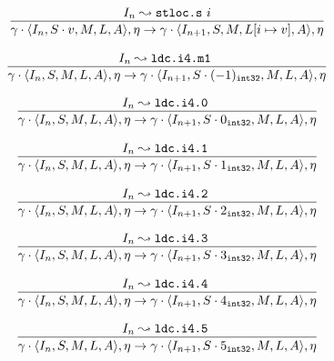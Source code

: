 \documentclass[declaration,shortabstract,english,mgr]{iithesis}
\newcommand{\mstate}[5] {
	\langle#1, #2, #3, #4, #5\rangle
}
\newcommand{\ipointsto}[3] {
	#1 \leadsto \texttt{#2} \text{ } #3
}
\newcommand{\sval}[2] {
	#1_\texttt{#2}
}
\newcommand{\setarrayitem}[3] {
	#1[#2 \mapsto #3]
}
\begin{document}
\begin{equation}
\label{eq:semantics_stlocs}
	\infer{
		\gamma \cdot \mstate{I_n}{S \cdot v}{M}{L}{A}, \eta
			\rightarrow
		\gamma \cdot \mstate{I_{n+1}}{S}{M}{\setarrayitem{L}{i}{v}}{A}, \eta
	}
	{\ipointsto{I_n}{stloc.s}{i}}
\end{equation}

\begin{equation}
\label{eq:semantics_ldci4m1}
	\infer{
		\gamma \cdot \mstate{I_n}{S}{M}{L}{A}, \eta
			\rightarrow
		\gamma \cdot \mstate{I_{n+1}}{S \cdot \sval{(-1)}{int32}}{M}{L}{A}, \eta
	}
	{\ipointsto{I_n}{ldc.i4.m1}}
\end{equation}

\begin{equation}
\label{eq:semantics_ldci40}
	\infer{
		\gamma \cdot \mstate{I_n}{S}{M}{L}{A}, \eta
			\rightarrow
		\gamma \cdot \mstate{I_{n+1}}{S \cdot \sval{0}{int32}}{M}{L}{A}, \eta
	}
	{\ipointsto{I_n}{ldc.i4.0}}
\end{equation}

\begin{equation}
\label{eq:semantics_ldci41}
	\infer{
		\gamma \cdot \mstate{I_n}{S}{M}{L}{A}, \eta
			\rightarrow
		\gamma \cdot \mstate{I_{n+1}}{S \cdot \sval{1}{int32}}{M}{L}{A}, \eta
	}
	{\ipointsto{I_n}{ldc.i4.1}}
\end{equation}

\begin{equation}
\label{eq:semantics_ldci42}
	\infer{
		\gamma \cdot \mstate{I_n}{S}{M}{L}{A}, \eta
			\rightarrow
		\gamma \cdot \mstate{I_{n+1}}{S \cdot \sval{2}{int32}}{M}{L}{A}, \eta
	}
	{\ipointsto{I_n}{ldc.i4.2}}
\end{equation}

\begin{equation}
\label{eq:semantics_ldci43}
	\infer{
		\gamma \cdot \mstate{I_n}{S}{M}{L}{A}, \eta
			\rightarrow
		\gamma \cdot \mstate{I_{n+1}}{S \cdot \sval{3}{int32}}{M}{L}{A}, \eta
	}
	{\ipointsto{I_n}{ldc.i4.3}}
\end{equation}

\begin{equation}
\label{eq:semantics_ldci44}
	\infer{
		\gamma \cdot \mstate{I_n}{S}{M}{L}{A}, \eta
			\rightarrow
		\gamma \cdot \mstate{I_{n+1}}{S \cdot \sval{4}{int32}}{M}{L}{A}, \eta
	}
	{\ipointsto{I_n}{ldc.i4.4}}
\end{equation}

\begin{equation}
\label{eq:semantics_ldci45}
	\infer{
		\gamma \cdot \mstate{I_n}{S}{M}{L}{A}, \eta
			\rightarrow
		\gamma \cdot \mstate{I_{n+1}}{S \cdot \sval{5}{int32}}{M}{L}{A}, \eta
	}
	{\ipointsto{I_n}{ldc.i4.5}}
\end{equation}
\end{document}
